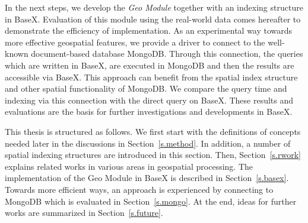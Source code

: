 \documentclass[a4paper,12pt]{article}
\begin{document}
In the next steps, we develop the \textit{Geo Module} together with an indexing structure in BaseX.
Evaluation of this module using the real-world data
comes hereafter to demonstrate the efficiency of implementation.
As an experimental way towards more effective geospatial features, 
we provide a driver to connect to the well-known document-based database MongoDB.
Through this connection, the queries which are written in BaseX, are executed in MongoDB and then the results are accessible via BaseX. This approach can benefit from the spatial index structure and other spatial functionality of MongoDB. 
We compare the query time and indexing via this connection with the direct query on BaseX. 
These results and evaluations are the basis for further investigations and developments in BaseX. 


This thesis is structured as follows. We first start with the definitions of concepts needed later in the discussions
in Section~\ref{s.method}. In addition, a number of spatial indexing structures are introduced in this section. 
Then, Section~\ref{s.rwork} explains related works in various areas in geospatial processing. The implementation of the Geo Module in BaseX is described in Section~\ref{s.basex}. 
Towards more efficient ways, an approach is experienced by connecting to MongoDB which is evaluated in Section~\ref{s.mongo}.
At the end, ideas for further works are summarized in
Section~\ref{s.future}.
\end{document}
